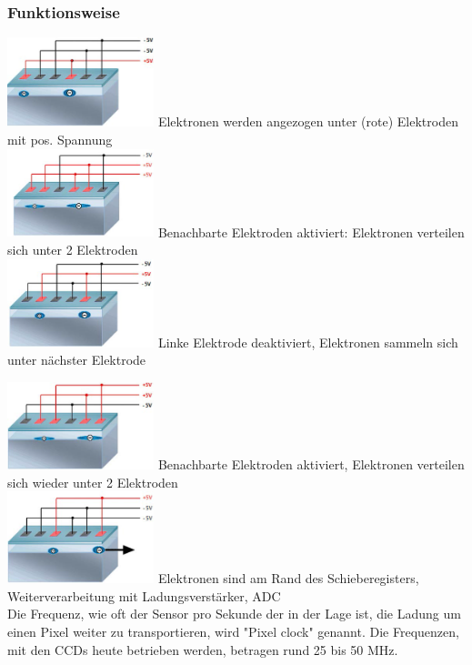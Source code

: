 \subsubsection{Funktionsweise}
\begin{multicols}{3}
    \includegraphics[width=0.32\textwidth]{images/ccd_01}
    Elektronen werden angezogen unter (rote) Elektroden mit pos. Spannung \\
    \includegraphics[width=0.32\textwidth]{images/ccd_02}
    Benachbarte Elektroden aktiviert: Elektronen verteilen sich unter 2 Elektroden \\
    \includegraphics[width=0.32\textwidth]{images/ccd_03}
    Linke Elektrode deaktiviert, Elektronen sammeln sich unter nächster Elektrode \\
\end{multicols}
\begin{multicols}{3}
    \includegraphics[width=0.32\textwidth]{images/ccd_04}
    Benachbarte Elektroden aktiviert, Elektronen verteilen sich wieder unter 2 Elektroden \\
    \includegraphics[width=0.32\textwidth]{images/ccd_05}
    Elektronen sind am Rand des Schieberegisters, Weiterverarbeitung mit Ladungsverstärker, ADC \\
    Die Frequenz, wie oft der Sensor pro Sekunde der in der Lage ist, die Ladung um einen Pixel weiter zu transportieren, wird "Pixel clock" genannt. Die Frequenzen, mit den CCDs heute betrieben werden, betragen rund 25 bis 50 MHz. \\ \ \\ \ \\ \ \\
\end{multicols}

